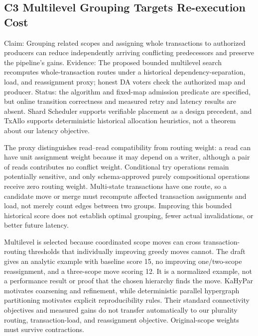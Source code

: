 \documentclass[11pt]{article}
\begin{document}
\subsection*{C3 Multilevel Grouping Targets Re-execution Cost}

Claim: Grouping related scopes and assigning whole transactions to authorized producers can reduce independently arriving conflicting predecessors and preserve the pipeline's gains. Evidence: The proposed bounded multilevel search recomputes whole-transaction routes under a historical dependency-separation, load, and reassignment proxy; honest DA voters check the authorized map and producer. Status: the algorithm and fixed-map admission predicate are specified, but online transition correctness and measured retry and latency results are absent. Shard Scheduler supports verifiable placement as a design precedent, and TxAllo supports deterministic historical allocation heuristics, not a theorem about our latency objective. \citep{shardscheduler,txallo}

The proxy distinguishes read--read compatibility from routing weight: a read can have unit assignment weight because it may depend on a writer, although a pair of reads contributes no conflict weight. Conditional try operations remain potentially sensitive, and only schema-approved purely compositional operations receive zero routing weight. Multi-state transactions have one route, so a candidate move or merge must recompute affected transaction assignments and load, not merely count edges between two groups. Improving this bounded historical score does not establish optimal grouping, fewer actual invalidations, or better future latency.

Multilevel is selected because coordinated scope moves can cross transaction-routing thresholds that individually improving greedy moves cannot. The draft gives an analytic example with baseline score 15, no improving one/two-scope reassignment, and a three-scope move scoring 12. It is a normalized example, not a performance result or proof that the chosen hierarchy finds the move. KaHyPar motivates coarsening and refinement, while deterministic parallel hypergraph partitioning motivates explicit reproducibility rules. Their standard connectivity objectives and measured gains do not transfer automatically to our plurality routing, transaction-load, and reassignment objective. Original-scope weights must survive contractions. \citep{kahypar,deterministicHypergraph}

\end{document}
